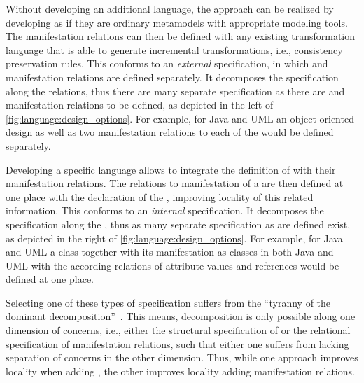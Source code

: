 Without developing an additional language, the \commonalities approach can be realized by developing \conceptmetamodels as if they are ordinary metamodels with appropriate modeling tools.
The manifestation relations can then be defined with any existing transformation language that is able to generate incremental transformations, i.e., consistency preservation rules.
This conforms to an \emph{external} specification, in which \conceptmetamodels and manifestation relations are defined separately.
It decomposes the specification along the relations, thus there are many separate specification as there are \conceptmetamodels and manifestation relations to be defined, as depicted in the left of \autoref{fig:language:design_options}.
For example, for Java and \gls{UML} an object-oriented design \conceptmetamodel as well as two manifestation relations to each of the \concretemetamodels would be defined separately.

Developing a specific language allows to integrate the definition of \commonalities with their manifestation relations.
The relations to manifestation of a \commonality are then defined at one place with the declaration of the \commonality, improving locality of this related information.
This conforms to an \emph{internal} specification.
It decomposes the specification along the \commonalities, thus as many separate specification as \commonalities are defined exist, as depicted in the right of \autoref{fig:language:design_options}.
For example, for Java and \gls{UML} a class \commonality together with its manifestation as classes in both Java and \gls{UML} with the according relations of attribute values and references would be defined at one place.

Selecting one of these types of specification suffers from the \enquote{tyranny of the dominant decomposition}~\cite{tarr1999Tyranny-ICSE}.
This means, decomposition is only possible along one dimension of concerns, i.e., either the structural specification of \commonalities or the relational specification of manifestation relations, such that either one suffers from lacking separation of concerns in the other dimension.
Thus, while one approach improves locality when adding \commonalities, the other improves locality adding manifestation relations.

